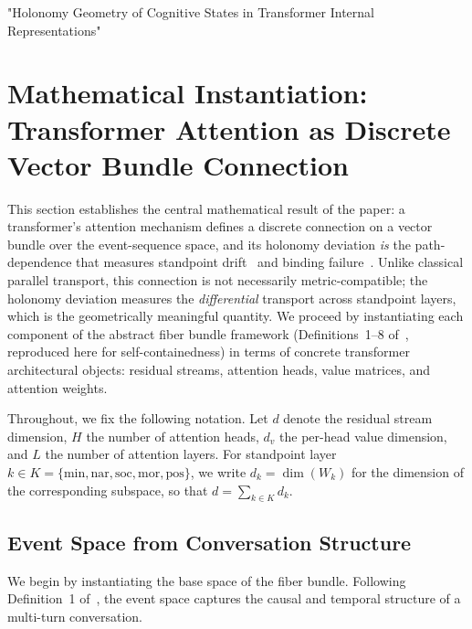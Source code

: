 "Holonomy Geometry of Cognitive States in Transformer Internal Representations"

\section{Mathematical Instantiation: Transformer Attention as Discrete Vector Bundle Connection}
\label{sec:instantiation}

This section establishes the central mathematical result of the paper: a transformer's
attention mechanism defines a discrete connection on a vector bundle over the event-sequence
space, and its holonomy deviation \emph{is} the path-dependence that measures standpoint
drift~\cite{LCESA} and binding failure~\cite{self-jurisdiction}. Unlike classical parallel
transport, this connection is not necessarily metric-compatible; the holonomy deviation
measures the \emph{differential} transport across standpoint layers, which is the
geometrically meaningful quantity. We proceed by instantiating each component of the
abstract fiber bundle framework (Definitions~1--8 of~\cite{LCESA}, reproduced here for
self-containedness) in terms of concrete transformer architectural objects: residual
streams, attention heads, value matrices, and attention weights.

Throughout, we fix the following notation. Let $d$ denote the residual stream dimension,
$H$ the number of attention heads, $d_v$ the per-head value dimension, and $L$ the number
of attention layers. For standpoint layer $k \in K = \{\mathrm{min}, \mathrm{nar},
\mathrm{soc}, \mathrm{mor}, \mathrm{pos}\}$, we write $d_k = \dim(W_k)$ for the dimension
of the corresponding subspace, so that $d = \sum_{k \in K} d_k$.

\subsection{Event Space from Conversation Structure}
\label{sec:event-space}

We begin by instantiating the base space of the fiber bundle. Following Definition~1
of~\cite{LCESA}, the event space captures the causal and temporal structure of a
multi-turn conversation.

